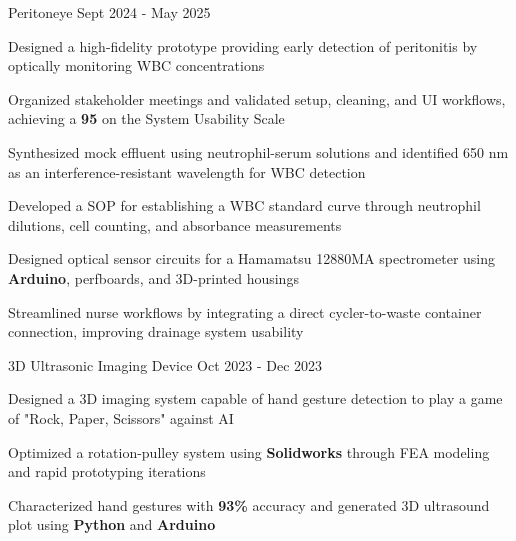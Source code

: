 \documentclass[11pt, a4paper]{russell}
\begin{document}
\begin{cventries}
\cvproject
  {Peritoneye} %
  {Sept 2024 - May 2025} %
  {
    \begin{cvitems}
        \item {Designed a high-fidelity prototype providing early detection of peritonitis by optically monitoring WBC concentrations}
        \item {Organized stakeholder meetings and validated setup, cleaning, and UI workflows, achieving a \textbf{95} on the System Usability Scale}  
        \item {Synthesized mock effluent using neutrophil-serum solutions and identified 650 nm as an interference-resistant wavelength for WBC detection} 
        \item {Developed a SOP for establishing a WBC standard curve through neutrophil dilutions, cell counting, and absorbance measurements}
        \item {Designed optical sensor circuits for a Hamamatsu 12880MA spectrometer using \textbf{Arduino}, perfboards, and 3D-printed housings} 
        \item {Streamlined nurse workflows by integrating a direct cycler-to-waste container connection, improving drainage system usability}
    \end{cvitems}
  }

\cvproject
  {3D Ultrasonic Imaging Device} %
  {Oct 2023 - Dec 2023} %
  {
    \begin{cvitems}
        \item {Designed a 3D imaging system capable of hand gesture detection to play a game of "Rock, Paper, Scissors" against AI}
        \item {Optimized a rotation-pulley system using \textbf{Solidworks} through FEA modeling and rapid prototyping iterations}
        \item {Characterized hand gestures with \textbf{93\%} accuracy and generated 3D ultrasound plot using \textbf{Python} and \textbf{Arduino}}
    \end{cvitems}
  }
\end{cventries}

\begin{cvskills}
\end{cvskills}

\vspace*{\fill}
\end{document}
